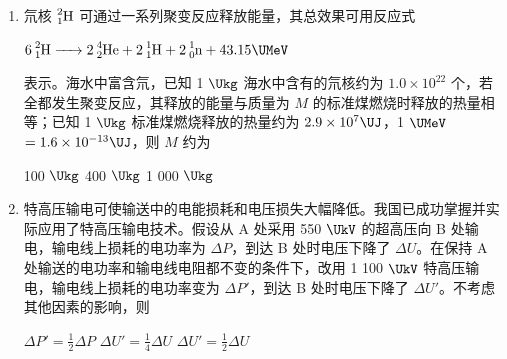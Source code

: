 \documentclass[\gkver]{gaokaozhenti}
\begin{document}
\begin{enumerate}
{故选 D。
}

\item
氘核 $\ce{^{2}_{1}H}$ 可通过一系列聚变反应释放能量，其总效果可用反应式

$\ce{6^{2}_{1}H -> 2^{4}_{2}He + 2^{1}_{1}H + 2^{1}_{0}n} + 43.15\UMeV$

表示。海水中富含氘，已知 1 $\Ukg$ 海水中含有的氘核约为 $1.0\times10^{22}$ 个，若全都发生聚变反应，其释放的能量与质量为 $M$ 的标准煤燃烧时释放的热量相等；已知 1 $\Ukg$ 标准煤燃烧释放的热量约为 $2.9\times10^{7}\UJ$，1 $\UMeV$ $=1.6\times10^{-13}\UJ$，则 $M$ 约为

{100 $\Ukg$}
{400 $\Ukg$}
{1 000 $\Ukg$}

\item
特高压输电可使输送中的电能损耗和电压损失大幅降低。我国已成功掌握并实际应用了特高压输电技术。假设从 A 处采用 550 $\UkV$ 的超高压向 B 处输电，输电线上损耗的电功率为 $\Delta P$，到达 B 处时电压下降了 $\Delta U$。在保持 A 处输送的电功率和输电线电阻都不变的条件下，改用 1 100 $\UkV$ 特高压输电，输电线上损耗的电功率变为 $\Delta P'$，到达 B 处时电压下降了 $\Delta U'$。不考虑其他因素的影响，则

{$\Delta P'=\frac{1}{2}\Delta P$}
{$\Delta U'=\frac{1}{4}\Delta U$}
{$\Delta U'=\frac{1}{2}\Delta U$}


\end{enumerate}
\end{document}
